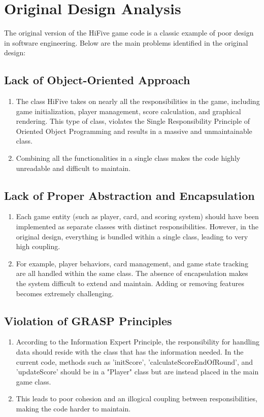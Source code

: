 \documentclass[a4paper, 12pt]{report}
\begin{document}
    \chapter{Original Design Analysis}
    The original version of the HiFive game code is a classic example of poor design in software engineering. Below are the main problems identified in the original design:
    
    \section{Lack of Object-Oriented Approach}
    \begin{enumerate}
        \item The class HiFive takes on nearly all the responsibilities in the game, including game initialization, player management, score calculation, and graphical rendering. This type of class, violates the Single Responsibility Principle of Oriented Object Programming and results in a massive and unmaintainable class.
        \item Combining all the functionalities in a single class makes the code highly unreadable and difficult to maintain.
    \end{enumerate}
    
    \section{Lack of Proper Abstraction and Encapsulation}
    \begin{enumerate}
        \item Each game entity (such as player, card, and scoring system) should have been implemented as separate classes with distinct responsibilities. However, in the original design, everything is bundled within a single class, leading to very high coupling.
        \item For example, player behaviors, card management, and game state tracking are all handled within the same class. The absence of encapsulation makes the system difficult to extend and maintain. Adding or removing features becomes extremely challenging.
    \end{enumerate}
    
    \section{Violation of GRASP Principles}
    \begin{enumerate}
        \item According to the Information Expert Principle, the responsibility for handling data should reside with the class that has the information needed. In the current code, methods such as 'initScore', 'calculateScoreEndOfRound', and 'updateScore' should be in a "Player" class but are instead placed in the main game class.
        \item This leads to poor cohesion and an illogical coupling between responsibilities, making the code harder to maintain.
    \end{enumerate} 
\end{document}

